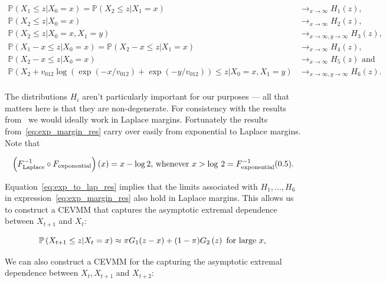 \documentclass[11pt,twoside,openany]{book}
\newcommand{\prob}{\mathbb{P}}
\newcommand{\ra}{\rightarrow}
\numberwithin{Theorem}{chapter}
\numberwithin{Definition}{chapter}
\numberwithin{Lemma}{chapter}
\numberwithin{Algorithm}{chapter}
\numberwithin{equation}{chapter}
\begin{document}
\begin{equation}\label{eq:exp_margin_res}
    \begin{split}
      \prob(X_1 \leq z | X_0 = x)=\prob(X_2 \leq z | X_1 = x) &\ra_{x\ra\infty} H_1(z),\\
      \prob(X_2 \leq z | X_0 = x) &\ra_{x\ra\infty} H_2(z),\\
      \prob(X_2 \leq z | X_0 = x, X_1 = y) &\ra_{x\ra\infty,y\ra\infty} H_3(z),\\
      \prob(X_1 - x \leq z | X_0 = x) = \prob(X_2 - x \leq z | X_1 = x) &\ra_{x\ra\infty} H_4(z),\\
      \prob(X_2 - x \leq z | X_0 = x) &\ra_{x\ra\infty} H_5(z)\text{ and }\\
      \prob(X_2 +v_{012}\log(\exp(-x/v_{012})+\exp(-y/v_{012}))\leq z | X_0 = x,
      X_1 = y) &\ra_{x\ra\infty,y\ra\infty} H_6(z).\\
    \end{split}
  \end{equation}

The distributions $H_i$ aren't particularly important for our purposes --- all
that matters here is that they are
non-degenerate.
For consistency with the results from~\cite{keef2013estimation} we would ideally work in Laplace margins. Fortunately
the results from~\eqref{eq:exp_margin_res} carry over easily from exponential to Laplace
margins. Note that

\begin{equation}\label{eq:exp_to_lap_res}
    \left(F_{\text{Laplace}}^{-1}\circ F_{\text{exponential}}\right) (x)=
    x - \log 2\text{, whenever $x > \log\,2=F_{\text{exponential}}^{-1}(0.5)$}.\\
  \end{equation}

Equation~\eqref{eq:exp_to_lap_res} implies that the limits associated with $H_1,\ldots,H_6$
in expression~\eqref{eq:exp_margin_res}
also hold in Laplace margins. This allows us to construct a CEVMM that
captures the asymptotic extremal dependence between $X_{t+1}$ and $X_{t}$:

\begin{equation}\label{eq:asslog_order1}
  \prob\left(X_{t+1}\leq z\middle| X_{t} = x\right) \approx \pi G_1 (z - x) + (1-\pi) G_2\left(z\right)
  \text{ for large }x,\\
\end{equation}

We can also construct a CEVMM for the capturing the asymptotic extremal dependence between
$X_{t},X_{t+1}$ and $X_{t+2}$:
\end{document}
